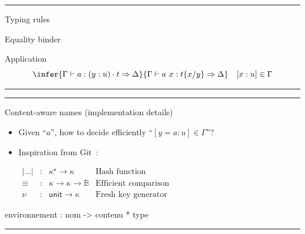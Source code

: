 \documentclass[12pt]{article} \usepackage{beamerarticle} \usepackage{fullpage}
\begin{document}
\hrule
\begin{frame}{Typing rules}
  \begin{block}{Equality binder}
  \end{block}
  \pause
  \begin{block}{Application}
    \[ \infer
      {\Gamma\vdash a : (y:u)\cdot t \Rightarrow\Delta}
      {\Gamma\vdash a\ x : t \{x/y\} \Rightarrow\Delta}
      \quad [x : u] \in \Gamma
      \]
  \end{block}
\end{frame}
\hrule

\hrule
\begin{frame}{Content-aware names (implementation details)}
  
\begin{itemize}
\item Given ``$a$'', how to decide efficiently ``$[y = a : u] \in \Gamma$''?

\item Inspiration from \textsf{Git}~:
\begin{center}
\begin{math}
\begin{array}{lllr}
| \dots | &:& \kappa^\star \rightarrow \kappa & \text{Hash function}\\
\equiv    &:& \kappa \rightarrow \kappa \rightarrow \mathbb{B} & \text{Efficient comparison}\\
\nu       &:& \textsf{unit} \rightarrow \kappa & \text{Fresh key generator}
\end{array}
\end{math}
\end{center}
\end{itemize}


environnement : nom -> contenu * type

\end{frame}
\hrule
\end{document}
